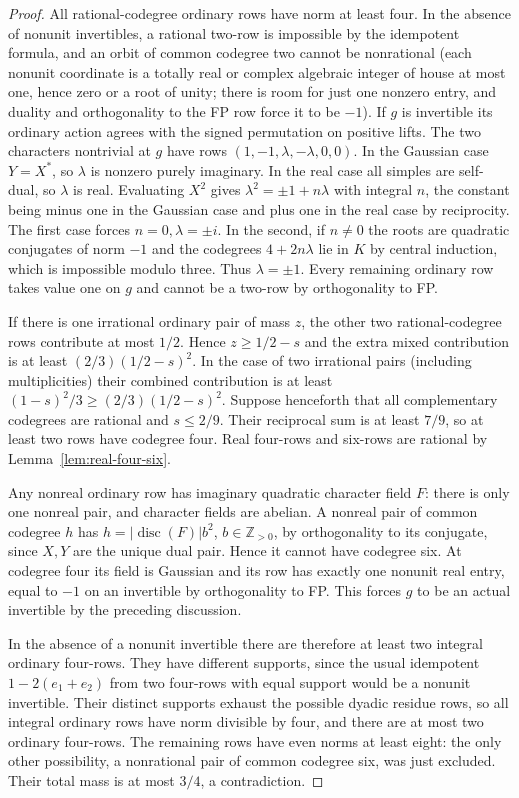 \documentclass[11pt,reqno]{amsart}
\theoremstyle{remark}\newtheorem{remark}[theorem]{Remark}
\numberwithin{equation}{section}
\begin{document}
\begin{proof}
All rational-codegree ordinary rows have norm at least four. In the
absence of nonunit invertibles, a rational two-row is impossible
by the idempotent formula, and an orbit of common codegree two
cannot be nonrational (each nonunit coordinate is a totally real
or complex algebraic integer of house at most one, hence zero
or a root of unity; there is room for just one nonzero entry,
and duality and orthogonality to the FP row force it to be $-1$).
If $g$ is invertible its ordinary action agrees with the signed
permutation on positive lifts. The two characters nontrivial at $g$
have rows $(1,-1,\lambda,-\lambda,0,0)$. In the Gaussian case
$Y=X^*$, so $\lambda$ is nonzero purely imaginary. In the real
case all simples are self-dual, so $\lambda$ is real. Evaluating
$X^2$ gives $\lambda^2=\pm1+n\lambda$ with integral $n$, the
constant being minus one in the Gaussian case and plus one in the
real case by reciprocity. The first case forces $n=0,\lambda=\pm i$.
In the second, if $n\ne0$ the roots are quadratic conjugates
of norm $-1$ and the codegrees $4+2n\lambda$ lie in $K$ by
central induction, which is impossible modulo three. Thus
$\lambda=\pm1$. Every remaining ordinary row takes value one
on $g$ and cannot be a two-row by orthogonality to FP.

If there is one irrational ordinary pair of mass $z$, the other
two rational-codegree rows contribute at most $1/2$. Hence
$z\ge1/2-s$ and the extra mixed contribution is at least
$(2/3)(1/2-s)^2$. In the case of two irrational pairs (including
multiplicities) their combined contribution is at least
$(1-s)^2/3\ge(2/3)(1/2-s)^2$. Suppose henceforth that all
complementary codegrees are rational and $s\le2/9$. Their
reciprocal sum is at least $7/9$, so at least two rows have
codegree four. Real four-rows and six-rows are rational by Lemma~\ref{lem:real-four-six}.

Any nonreal ordinary row has imaginary quadratic character field $F$: there is only one nonreal pair, and character fields are abelian. A nonreal pair of common codegree $h$ has
$h=|\operatorname{disc}(F)|b^2$, $b\in\mathbb Z_{>0}$, by
orthogonality to its conjugate, since $X,Y$ are the unique
dual pair. Hence it cannot have codegree six. At codegree four
its field is Gaussian and its row has exactly one nonunit real
entry, equal to $-1$ on an invertible by orthogonality to FP.
This forces $g$ to be an actual invertible by the preceding
discussion.

In the absence of a nonunit invertible there are therefore at
least two integral ordinary four-rows. They have different
supports, since the usual idempotent $1-2(e_1+e_2)$ from two
four-rows with equal support would be a nonunit invertible.
Their distinct supports exhaust the possible dyadic residue
rows, so all integral ordinary rows have norm divisible by
four, and there are at most two ordinary four-rows. The remaining
rows have even norms at least eight: the only other possibility,
a nonrational pair of common codegree six, was just excluded.
Their total mass is at most $3/4$, a contradiction.


\end{proof}
\end{document}
